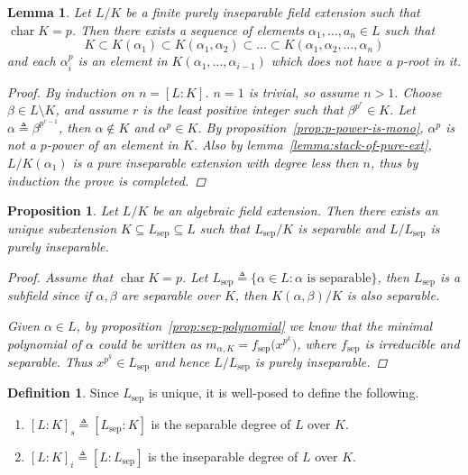 \documentclass[a4paper]{article}
\newcommand{\defeq}{\triangleq}
\DeclareMathOperator{\Char}{char}
\theoremstyle{mystyle}
\newtheorem{lemma}{Lemma}
\newtheorem{proposition}{Proposition}
\theoremstyle{remark}
\theoremstyle{definition}
\theoremstyle{definition}
\newtheorem{definition}{Definition}
\begin{document}
  \begin{lemma} \label{lemma:building-tower}
    Let $L/K$ be a finite purely inseparable field extension such that $\Char K = p$.
    Then there exists a sequence of elements $\alpha_1, \dots, a_n \in L$ such that
    \[ K \subset K(\alpha_1) \subset K(\alpha_1, \alpha_2) \subset \dots \subset K(\alpha_1, \alpha_2, \dots, \alpha_n) \]
    and each $\alpha_i^p$ is an element in $K(\alpha_1, \dots, \alpha_{i-1})$ which
    does not have a $p$-root in it.

    \begin{proof}
      By induction on $n = [L: K]$. $n = 1$ is trivial, so assume $n > 1$.
      Choose $\beta \in L \setminus K$, and assume $r$ is the least positive integer
      such that $\beta^{p^r} \in K$. Let $\alpha \defeq \beta^{p^{r-1}}$, then $\alpha \not\in K$
      and $\alpha^p \in K$. By proposition~\ref{prop:p-power-is-mono}, $\alpha^p$ is not a $p$-power
      of an element in $K$. Also by lemma~\ref{lemma:stack-of-pure-ext}, $L / K(\alpha_1)$
      is a pure inseparable extension with degree less then $n$, thus by induction the prove is completed.
    \end{proof}
  \end{lemma}


  \begin{proposition} \label{prop:decomp-of-insep}
    Let $L/K$ be an algebraic field extension. Then there exists an unique
    subextension $K \subseteq L_{\text{sep}} \subseteq L$ such that $L_{\text{sep}}/K$
    is separable and $L/L_{\text{sep}}$ is purely inseparable.

    \begin{proof}
      Assume that $\Char K = p$. Let $L_{\text{sep}} \defeq \{ \alpha \in L : \alpha \text{ is separable}\}$,
      then $L_{\text{sep}}$ is a subfield since if $\alpha, \beta$ are separable over $K$, then $K(\alpha, \beta)/K$
      is also separable.

      Given $\alpha \in L$, by proposition~\ref{prop:sep-polynomial} we know that the minimal
      polynomial of $\alpha$ could be written as $m_{\alpha, K} = f_\text{sep}\big(x^{p^k}\big)$,
      where $f_\text{sep}$ is irreducible and separable. Thus $x^{p^k} \in L_\text{sep}$ and
      hence $L/L_\text{sep}$ is purely inseparable.
    \end{proof}
  \end{proposition}

  \begin{definition}
    Since $L_\text{sep}$ is unique, it is well-posed to define the following.
    \begin{enumerate}
      \item $[L: K]_s \defeq [L_\text{sep} : K]$ is the separable degree of $L$ over $K$.
      \item $[L: K]_i \defeq [L : L_\text{sep}]$ is the inseparable degree of $L$ over $K$.
    \end{enumerate}
  \end{definition}
\end{document}
